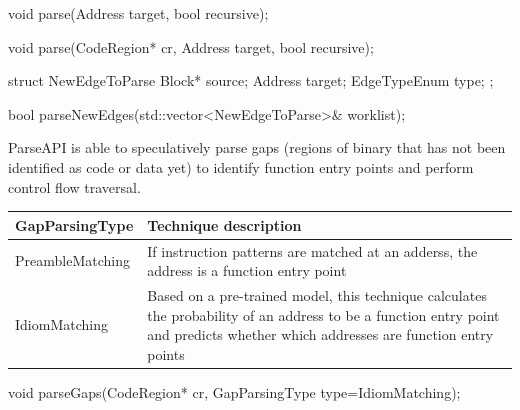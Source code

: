 \begin{apient}
void parse(Address target,
           bool recursive);
\end{apient}

\begin{apient}
void parse(CodeRegion* cr,
           Address target,
           bool recursive);
\end{apient}

\begin{apient}
struct NewEdgeToParse {
    Block* source;
    Address target;
    EdgeTypeEnum type;
};

bool parseNewEdges(std::vector<NewEdgeToParse>& worklist);
\end{apient}

ParseAPI is able to speculatively parse gaps
(regions of binary that has not been identified as code or data yet)
to identify function entry points and
perform control flow traversal.

\begin{center}
\begin{tabular}{lp{10cm}}
\toprule
GapParsingType & Technique description \\
\midrule
PreambleMatching & If instruction patterns are matched at an adderss, the address is a function entry point  \\
IdiomMatching & Based on a pre-trained model, this technique calculates the probability of an address to be a function entry point and predicts whether which addresses are function entry points\\
\bottomrule
\end{tabular}
\end{center}

\begin{apient}
void parseGaps(CodeRegion* cr,
               GapParsingType type=IdiomMatching);
\end{apient}

